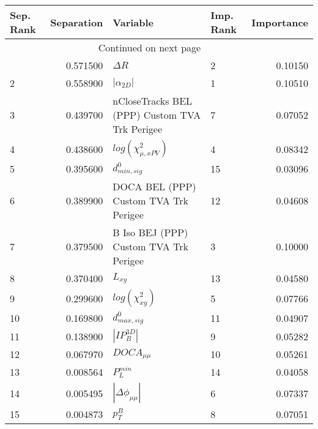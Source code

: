 \usepackage{lscape}

\begin{landscape}
\begin{longtable}{lrllr}
\toprule
Sep. Rank &  Separation &                                       Variable & Imp. Rank &  Importance \\
\midrule
\endhead
\midrule
\multicolumn{3}{r}{{Continued on next page}} \\
\midrule
\endfoot

\bottomrule
\endlastfoot
        1 &    0.571500 &                                     $\Delta R$ &         2 &     0.10150 \\
        2 &    0.558900 &                                $|\alpha_{2D}|$ &         1 &     0.10510 \\
        3 &    0.439700 &  nCloseTracks BEL (PPP) Custom TVA Trk Perigee &         7 &     0.07052 \\
        4 &    0.438600 &                      $log(\chi^{2}_{\mu,xPV})$ &         4 &     0.08342 \\
        5 &    0.395600 &                               $d^0_{min, sig}$ &        15 &     0.03096 \\
        6 &    0.389900 &          DOCA BEL (PPP) Custom TVA Trk Perigee &        12 &     0.04608 \\
        7 &    0.379500 &         B Iso BEJ (PPP) Custom TVA Trk Perigee &         3 &     0.10000 \\
        8 &    0.370400 &                                       $L_{xy}$ &        13 &     0.04580 \\
        9 &    0.299600 &                           $log(\chi^{2}_{xy})$ &         5 &     0.07766 \\
       10 &    0.169800 &                               $d^0_{max, sig}$ &        11 &     0.04907 \\
       11 &    0.138900 &                                $|IP_{B}^{3D}|$ &         9 &     0.05282 \\
       12 &    0.067970 &                                $DOCA_{\mu\mu}$ &        10 &     0.05261 \\
       13 &    0.008564 &                                  $P^{min}_{L}$ &        14 &     0.04058 \\
       14 &    0.005495 &                       $|\Delta \phi_{\mu\mu}|$ &         6 &     0.07337 \\
       15 &    0.004873 &                                      $p^B_{T}$ &         8 &     0.07051 \\
\end{longtable}

\end{landscape}
